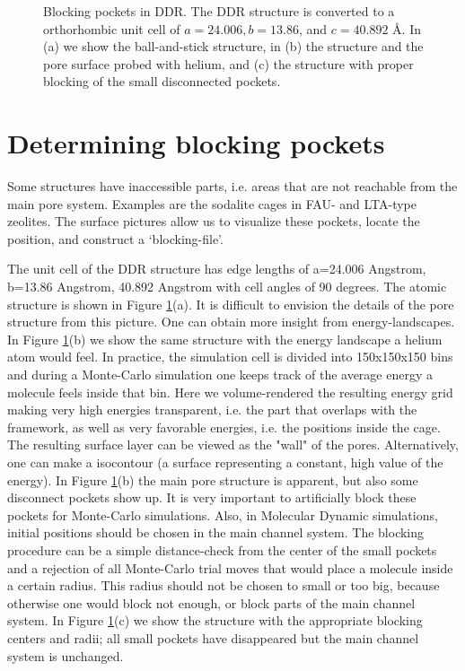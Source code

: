 \begin{figure}[t]
  \caption{Blocking pockets in DDR. The DDR structure is converted to a orthorhombic unit cell of
   $a=24.006,b=13.86$, and $c=40.892$ \AA. In (a) we show the ball-and-stick structure, in (b) the structure
   and the pore surface probed with helium, and (c) the structure with proper blocking of the small disconnected pockets.}
  \label{Fig: DDR blocking}
\end{figure}

\section{Determining blocking pockets}

Some structures have inaccessible parts, i.e. areas that are not reachable from the main pore system. Examples
are the sodalite cages in FAU- and LTA-type zeolites. The surface pictures allow us to visualize these pockets,
locate the position, and construct a `blocking-file'.

The unit cell of the DDR structure has edge lengths of a=24.006 Angstrom, b=13.86 Angstrom, 40.892 Angstrom 
with cell angles of 90 degrees. The atomic structure is shown in Figure \ref{Fig: DDR blocking}(a). It is difficult to envision 
the details of the pore structure from this picture. One can obtain more insight from energy-landscapes.
In Figure \ref{Fig: DDR blocking}(b) we show the same structure with the energy landscape a helium atom would feel. In practice, 
the simulation cell is divided into 150x150x150 bins and during a Monte-Carlo simulation one keeps track of 
the average energy a molecule feels inside that bin. Here we volume-rendered the resulting energy grid 
making very high energies transparent, i.e. the part that overlaps with the framework, as well as very 
favorable energies, i.e. the positions inside the cage. The resulting surface layer can be viewed as the 
"wall" of the pores. Alternatively, one can make a isocontour (a surface representing a constant, 
high value of the energy). In Figure \ref{Fig: DDR blocking}(b) the main pore structure is apparent, 
but also some disconnect pockets show up. It is 
very important to artificially block these pockets for Monte-Carlo simulations. Also, in 
Molecular Dynamic simulations, initial positions should be chosen in the main channel system. The blocking 
procedure can be a simple distance-check from the center of the small pockets and a rejection of all 
Monte-Carlo trial moves that would place a molecule inside a certain radius. This radius should not be 
chosen to small or too big, because otherwise one would block not enough, or block parts of the 
main channel system. In Figure \ref{Fig: DDR blocking}(c) we show the structure with the appropriate blocking centers and radii; 
all small pockets have disappeared but the main channel system is unchanged.

